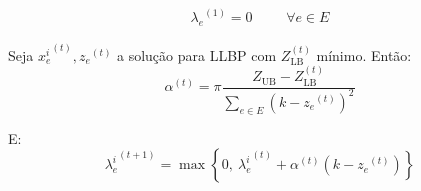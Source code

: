     \begin{align*}
        {\lambda_e}^{(1)} = 0 && &\forall e \in E
    \end{align*}

    Seja ${x_e^i}^{(t)}, {z_e}^{(t)}$ a solução para LLBP com $Z_\text{LB}^{(t)}$ mínimo. Então: 
    \[
        \alpha^{(t)} = \pi \frac{Z_\text{UB} - Z_\text{LB}^{(t)}}{\sum_{e \in E} \left(k - {z_e}^{(t)}\right)^2}
    \]

    E:
    \[
        {\lambda_e^i}^{(t+1)} = \max\left\{0,~ {\lambda_e^i}^{(t)} + \alpha^{(t)} \left(k - {z_e}^{(t)}\right)\right\}
    \]
